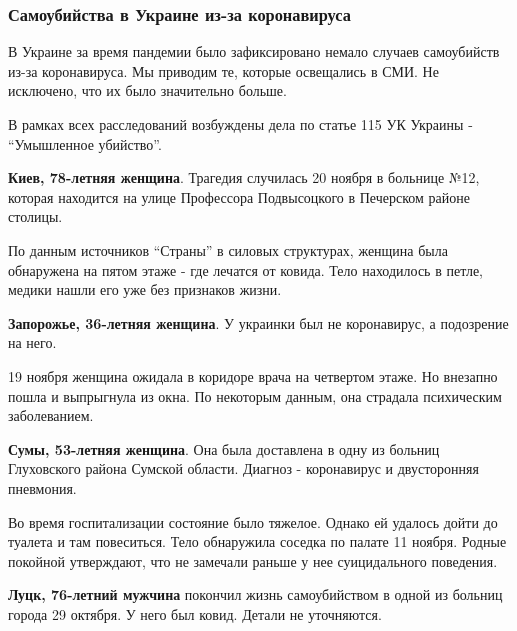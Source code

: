  
 
 
 
 

\subsubsection{Самоубийства в Украине из-за коронавируса}
\label{sec:23_11_2020.news.ua.strana.1.covid_suicides_ukr.suicides}

В Украине за время пандемии было зафиксировано немало случаев самоубийств из-за
коронавируса. Мы приводим те, которые освещались в СМИ. Не исключено, что их
было значительно больше.

В рамках всех расследований возбуждены дела по статье 115 УК Украины -
\enquote{Умышленное убийство}.

\textbf{Киев, 78-летняя женщина}. Трагедия случилась 20 ноября в больнице №12,
которая находится на улице Профессора Подвысоцкого в Печерском районе
столицы.

По данным источников \enquote{Страны} в силовых структурах, женщина была
обнаружена на пятом этаже - где лечатся от ковида. Тело находилось в
петле, медики нашли его уже без признаков жизни.

\textbf{Запорожье, 36-летняя женщина}. У украинки был не коронавирус, а подозрение
на него.

19 ноября женщина ожидала в коридоре врача на четвертом этаже. Но внезапно
пошла и выпрыгнула из окна. По некоторым данным, она страдала психическим
заболеванием. 

\textbf{Сумы, 53-летняя женщина}. Она была доставлена в одну из больниц Глуховского
района Сумской области. Диагноз - коронавирус и двусторонняя пневмония.

Во время госпитализации состояние было тяжелое. Однако ей удалось дойти до
туалета и там повеситься. Тело обнаружила соседка по палате 11 ноября.  Родные
покойной утверждают, что не замечали раньше у нее суицидального поведения. 

\textbf{Луцк, 76-летний мужчина} покончил жизнь самоубийством в одной из больниц
города 29 октября. У него был ковид. Детали не уточняются. 

